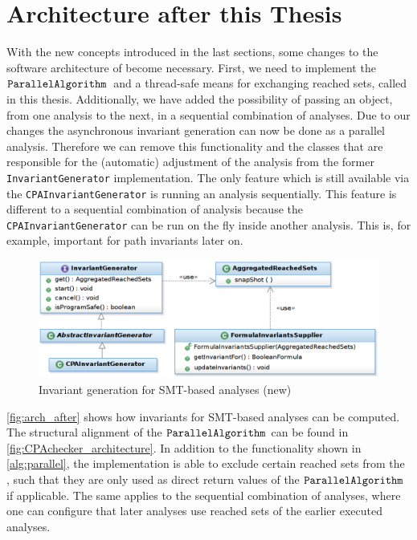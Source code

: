 \section{Architecture after this Thesis}\label{title:architecture_final}
With the new concepts introduced in the last sections, some changes to the software architecture of \CPAchecker{} become necessary. First, we need to implement the 
$\mathtt{ParallelAlgorithm}{}$\, and a thread-safe means for exchanging reached sets,
called \AggregatedReachedSets{} in this thesis. Additionally, we have added the possibility 
of passing an \AggregatedReachedSets{} object, from one analysis to the next, in a sequential combination of analyses. Due to our changes the asynchronous invariant generation
can now be done as a parallel analysis. Therefore we can remove this functionality and the classes that are responsible for the (automatic) adjustment of 
the analysis from the former \texttt{InvariantGenerator} implementation. The only feature which is still available via the \texttt{CPAInvariantGenerator} is running an analysis sequentially. This feature is different to a sequential combination of 
analysis because the \texttt{CPAInvariantGenerator} can be run on the fly inside another analysis. This is, for example, important for path invariants later on.

\begin{figure}
  \includegraphics[width=\textwidth]{../graphics/invgen_arch_new.png}
 \caption{Invariant generation for \acs{SMT}-based analyses (new)}
 \label{fig:arch_after}
\end{figure}

\autoref{fig:arch_after} shows how invariants for \ac{SMT}-based analyses can be computed. The structural alignment of the $\mathtt{ParallelAlgorithm}{}$ can be found in 
\autoref{fig:CPAchecker_architecture}. In addition to the functionality shown in \autoref{alg:parallel}, the implementation is able to exclude certain reached sets from the 
\AggregatedReachedSets{}, such that they are only used as direct return values of the $\mathtt{ParallelAlgorithm}{}$ if applicable. The same applies to the sequential
combination of analyses, where one can configure that later analyses use reached sets of the earlier executed analyses. 

